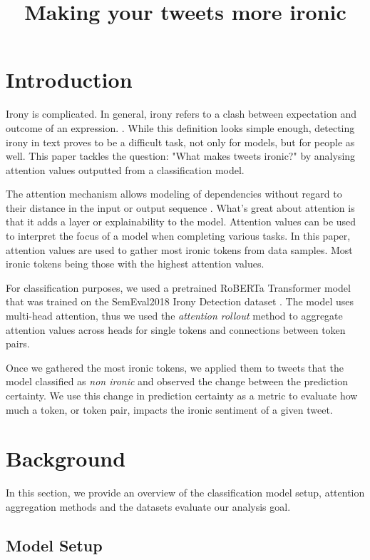 \documentclass[10pt, a4paper]{article}
\title{Making your tweets more ironic}
\begin{document}
\maketitleabstract

\section{Introduction}

Irony is complicated.
In general, irony refers to a clash between expectation and outcome of an expression. \citep{kreutz-20}. 
While this definition looks simple enough, detecting irony in text proves to be a difficult task, not only for models, but for people as well.
This paper tackles the question: "What makes tweets ironic?" by analysing attention values outputted from a classification model.

The attention mechanism allows modeling of dependencies without regard to their distance in the input or output sequence \citep{all-you-need}.
What's great about attention is that it adds a layer or explainability to the model. Attention values can be used to interpret the focus of a model when completing various tasks.
In this paper, attention values are used to gather most ironic tokens from data samples. Most ironic tokens being those with the highest attention values.

For classification purposes, we used a pretrained RoBERTa Transformer model that was trained on the SemEval2018 Irony Detection dataset \citep{roberta}.
The model uses multi-head attention, thus we used the \textit{attention rollout} method to aggregate attention values across heads for single tokens and connections between token pairs.

Once we gathered the most ironic tokens, we applied them to tweets that the model classified as \textit{non ironic} and observed the change between the prediction certainty.
We use this change in prediction certainty as a metric to evaluate how much a token, or token pair, impacts the ironic sentiment of a given tweet.

\section{Background}

In this section, we provide an overview of the classification model setup, attention aggregation methods and the datasets evaluate our analysis goal.

\subsection{Model Setup}
\label{sec:first}
\end{document}

